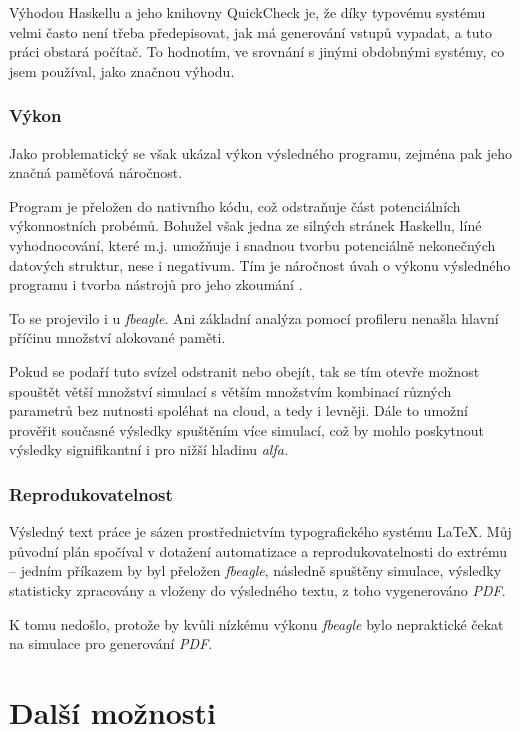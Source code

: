 \begin{tcolorbox}[ title={Vhodnost zvolených nástrojů pro simulaci}
                 , breakable
                 ]
Výhodou Haskellu a jeho knihovny QuickCheck \citep{Claessen:2000:QLT:351240.351266} je, že díky typovému systému velmi
často není třeba předepisovat, jak má generování vstupů vypadat, a tuto práci obstará počítač.
To hodnotím, ve srovnání s jinými obdobnými systémy, co jsem používal, jako značnou výhodu.

\subsubsection*{Výkon}

Jako problematický se však ukázal výkon výsledného programu, zejména pak jeho značná paměťová náročnost.

Program je přeložen do nativního kódu, což odstraňuje část potenciálních výkonnostních probémů. Bohužel však jedna ze silných stránek
Haskellu, líné vyhodnocování, které m.j. umožňuje i snadnou tvorbu potenciálně nekonečných datových struktur, nese i negativum.
Tím je náročnost úvah o výkonu výsledného programu i tvorba nástrojů pro jeho zkoumání \citep{wadler1998no}.

To se projevilo i u \textit{fbeagle}. Ani základní analýza pomocí profileru nenašla hlavní příčinu množství alokované paměti.

Pokud se podaří tuto svízel odstranit nebo obejít, tak se tím otevře možnost spouštět větší množství simulací s větším množstvím kombinací
různých parametrů bez nutnosti spoléhat na cloud, a tedy i levněji. Dále to umožní prověřit současné výsledky spuštěním více simulací, což by
mohlo poskytnout výsledky signifikantní i pro nižší hladinu \textit{alfa.}

\subsubsection*{Reprodukovatelnost}

Výsledný text práce je sázen prostřednictvím typografického systému \LaTeX. Můj původní plán spočíval v dotažení
automatizace a reprodukovatelnosti do extrému -- jedním příkazem by byl přeložen \textit{fbeagle}, následně
spuštěny simulace, výsledky statisticky zpracovány a vloženy do výsledného textu, z toho vygenerováno \textit{PDF}.

K tomu nedošlo, protože by kvůli nízkému výkonu \textit{fbeagle} bylo nepraktické čekat na simulace pro generování
\textit{PDF}.

\end{tcolorbox}

\section{Další možnosti}

